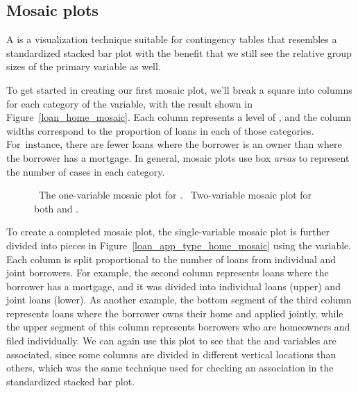 
\subsection{Mosaic plots}
\label{mosaic_plots_subsection}

A  is a visualization technique
suitable for contingency tables that resembles
a standardized stacked bar plot with the benefit
that we still see the relative group sizes of the
primary variable as well.

To get started in creating our first mosaic plot,
we'll break a square into columns for each category
of the  variable,
with the result shown in Figure~\ref{loan_home_mosaic}.
Each column represents a level of ,
and the column widths correspond to the proportion of
loans in each of those categories.
For~instance, there are fewer loans where the borrower
is an owner than where the borrower has a mortgage.
In general, mosaic plots use box \emph{areas}
to represent the number of cases in each category.

\begin{figure}[h]
  \centering
  \caption{~The one-variable mosaic
      plot for .
      ~Two-variable mosaic
      plot for both 
      and .}
  \label{loan_app_type_home_mosaic_plot}
\end{figure}

To create a completed mosaic plot, the single-variable
mosaic plot is further divided into pieces in
Figure~\ref{loan_app_type_home_mosaic} using the
 variable.
Each column is split proportional to the
number of loans from individual and joint
borrowers.
For example, the second column represents loans
where the borrower has a mortgage,
and it was divided into individual loans (upper)
and joint loans (lower).
As another example, the bottom segment of the third column
represents loans where the borrower owns their home
and applied jointly, while the upper segment
of this column represents
borrowers who are homeowners and filed individually.
We can again use this plot to see that
the  and 
variables are associated, since some columns are divided
in different vertical locations than others,
which was the same technique used for checking an
association in the standardized stacked bar plot.

